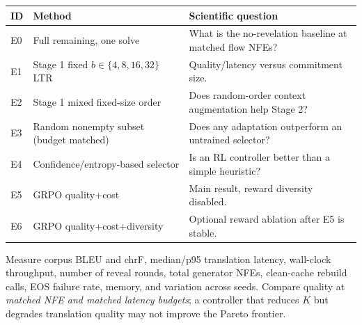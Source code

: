 \documentclass[11pt,a4paper]{article}
\begin{document}
\begin{center}
\begin{tabularx}{\linewidth}{@{}llX@{}}\toprule
ID & Method & Scientific question \\ \midrule
E0 & Full remaining, one solve & What is the no-revelation baseline at matched flow NFEs? \\
E1 & Stage 1 fixed $b\in\{4,8,16,32\}$ LTR & Quality/latency versus commitment size. \\
E2 & Stage 1 mixed fixed-size order & Does random-order context augmentation help Stage 2? \\
E3 & Random nonempty subset (budget matched) & Does any adaptation outperform an untrained selector? \\
E4 & Confidence/entropy-based selector & Is an RL controller better than a simple heuristic? \\
E5 & GRPO quality+cost & Main result, reward diversity disabled. \\
E6 & GRPO quality+cost+diversity & Optional reward ablation after E5 is stable. \\ \bottomrule
\end{tabularx}
\end{center}
Measure corpus BLEU and chrF, median/p95 translation latency, wall-clock throughput, number of reveal rounds, total generator NFEs, clean-cache rebuild calls, EOS failure rate, memory, and variation across seeds. Compare quality at \emph{matched NFE and matched latency budgets}; a controller that reduces $K$ but degrades translation quality may not improve the Pareto frontier.
\end{document}
